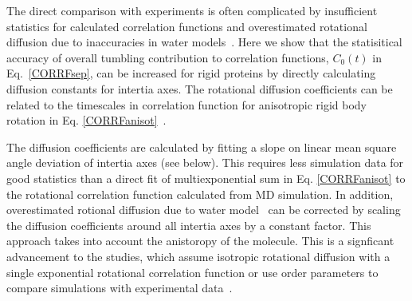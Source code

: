 \documentclass[pre,aps,floatfix,authordate1-4,twocolumn]{revtex4-1}
\begin{document}
The direct comparison with experiments is often complicated by
insufficient statistics for calculated correlation functions and overestimated
rotational diffusion due to inaccuracies in water models~\cite{wong08,anderson12}.
Here we show that the statisitical accuracy of overall tumbling contribution to
correlation functions, $C_0(t)$ in Eq.~\ref{CORRFsep}, can be increased for
rigid proteins by directly calculating diffusion constants for intertia axes.
The rotational diffusion coefficients can be related to the timescales
in correlation function for anisotropic rigid body rotation
in Eq. \ref{CORRFanisot}~\cite{woessner62,Note1}.

The diffusion coefficients are calculated by fitting a slope on linear mean
square angle deviation of intertia axes (see below). This requires less simulation data
for good statistics than a direct fit of multiexponential sum in Eq. \ref{CORRFanisot}
to the rotational correlation function calculated from MD simulation.
In addition, overestimated rotional diffusion due to water model~\cite{wong08} can
be corrected by scaling the diffusion coefficients around all intertia axes
by a constant factor. This approach takes into account the anistoropy of
the molecule. This is a signficant advancement to the studies, which assume
isotropic rotational diffusion with a single exponential rotational correlation
function \cite{showalter07a,showalter07b,maragakis08,gu14,allner15} or
use order parameters to compare simulations with experimental data~\cite{gu14,maragakis08,trbovic08,best04}.
\end{document}
